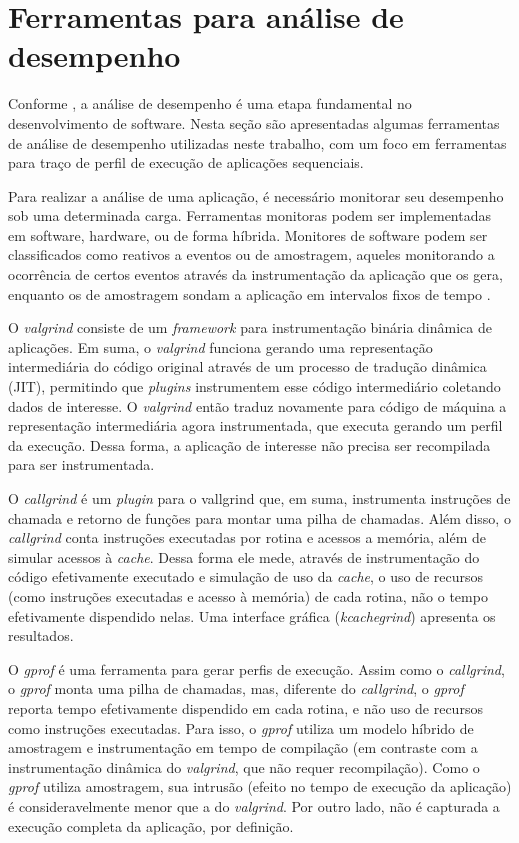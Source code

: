 \documentclass[cic,tc]{iiufrgs}
\begin{document}
\section{Ferramentas para análise de desempenho}
\label{sec:antanal}

Conforme \cite{jain2art}, a análise de desempenho é uma etapa fundamental no
desenvolvimento de software. Nesta seção são apresentadas algumas ferramentas
de análise de desempenho utilizadas neste trabalho, com um foco em ferramentas
para traço de perfil de execução de aplicações sequenciais.

Para realizar a análise de uma aplicação, é necessário monitorar seu desempenho
sob uma determinada carga. Ferramentas monitoras podem ser implementadas em
software, hardware, ou de forma híbrida. Monitores de software podem ser
classificados como reativos a eventos ou de amostragem, aqueles monitorando a
ocorrência de certos eventos através da instrumentação da aplicação que os
gera, enquanto os de amostragem sondam a aplicação em intervalos fixos de
tempo \cite{jain2art}.

O \textit{valgrind} \cite{nethercote2007valgrind} consiste de um \textit{framework} para
instrumentação binária dinâmica de aplicações. Em suma, o \textit{valgrind} funciona
gerando uma representação intermediária do código original através de um
processo de tradução dinâmica (JIT), permitindo que \textit{plugins}
instrumentem esse código intermediário coletando dados de interesse. O \textit{valgrind}
então traduz novamente para código de máquina a representação intermediária
agora instrumentada, que executa gerando um perfil da execução. Dessa forma, a
aplicação de interesse não precisa ser recompilada para ser instrumentada.

O \textit{callgrind} \cite{weidendorfer2008sequential} é um \textit{plugin} para o
vallgrind que, em suma, instrumenta instruções de chamada e retorno de funções
para montar uma pilha de chamadas. Além disso, o \textit{callgrind} conta instruções
executadas por rotina e acessos a memória, além de simular acessos à \textit{cache}.
Dessa forma ele mede, através de instrumentação do código efetivamente
executado e simulação de uso da \textit{cache}, o uso de recursos (como instruções
executadas e acesso à memória) de cada rotina, não o tempo efetivamente
dispendido nelas. Uma interface gráfica (\textit{kcachegrind}) apresenta os resultados.

O \textit{gprof} \cite{graham1982gprof} é uma ferramenta para gerar perfis de execução.
Assim como o \textit{callgrind}, o \textit{gprof} monta uma pilha de chamadas, mas, diferente do
\textit{callgrind}, o \textit{gprof} reporta tempo efetivamente dispendido em cada rotina, e não
uso de recursos como instruções executadas. Para isso, o \textit{gprof} utiliza um
modelo híbrido de amostragem e instrumentação em tempo de compilação (em
contraste com a instrumentação dinâmica do \textit{valgrind}, que não requer
recompilação). Como o \textit{gprof} utiliza amostragem, sua intrusão (efeito no tempo
de execução da aplicação) é consideravelmente menor que a do \textit{valgrind}. Por
outro lado, não é capturada a execução completa da aplicação, por definição.
\end{document}
